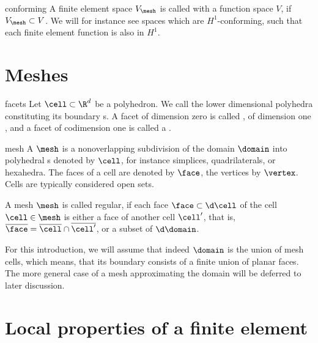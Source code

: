 \begin{Definition}{conforming}
  A finite element space $V_{\mesh}$ is called 
  with a function space $V$, if $V_{\mesh} \subset V$. We will for
  instance see spaces which are $H^1$-conforming, such that each
  finite element function is also in $H^1$.
\end{Definition}

\section{Meshes}

\begin{Definition}{facets}
  Let $\cell\subset \R^d$ be a polyhedron. We call the lower
  dimensional polyhedra constituting its boundary s. A
  facet of dimension zero is called , of dimension one
  , and a facet of codimension one is called a
  .
\end{Definition}

\begin{Definition}{mesh}
  A  $\mesh$ is a nonoverlapping subdivision of the
  domain $\domain$ into polyhedral s denoted by $\cell$,
  for instance simplices, quadrilaterals, or hexahedra. The
  faces of a cell are denoted by $\face$, the
  vertices by $\vertex$. Cells are typically considered open sets.

  A mesh $\mesh$ is called regular, if each face
  $\face \subset \d\cell$ of the cell $\cell\in\mesh$ is either a
  face of another cell $\cell^\prime$, that is,
  $\overline{\face} = \overline{\cell} \cap \overline{\cell^\prime}$,
  or a subset of $\d\domain$.
\end{Definition}

\begin{remark}
  For this introduction, we will assume that indeed $\domain$ is the
  union of mesh cells, which means, that its boundary consists of a
  finite union of planar faces. The more general case of a mesh
  approximating the domain will be deferred to later discussion.
\end{remark}


\section{Local properties of a finite element}

